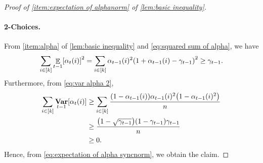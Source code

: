 \documentclass[letterpaper,11pt]{article}
\DeclarePairedDelimiter{\rbra}{\lparen}{\rparen} %
\DeclarePairedDelimiter{\sbra}{\lbrack}{\rbrack} %
\DeclareMathOperator*{\E}{\mathbb{E}}
\DeclareMathOperator*{\Var}{\mathbf{Var}}
\newcommand{\alphanorm}{\gamma}
\begin{document}
\begin{proof}[Proof of \cref{item:expectation of alphanorm} of \cref{lem:basic inequality}]
    \paragraph*{2-Choices.}
    From \cref{item:alpha} of \cref{lem:basic inequality} and
    \cref{eq:squared sum of alpha}, we have 
    \begin{align}
       \sum_{i\in [k]}\E_{t-1}\sbra*{\alpha_t(i)}^2
        =\sum_{i\in [k]}\alpha_{t-1}(i)^2\rbra*{1+\alpha_{t-1}(i)-\alphanorm_{t-1}}^2
        \geq \alphanorm_{t-1}. \label{eq:alphanorm 2choices 1}
    \end{align}
    Furthermore, from \cref{eq:var alpha 2}, 
    \begin{align*}
    \sum_{i\in [k]}\Var_{t-1}[\alpha_t(i)]
    &\geq\sum_{i\in [k]}\frac{\rbra*{1-\alpha_{t-1}(i)}\alpha_{t-1}(i)^2\rbra*{1-\alpha_{t-1}(i)^2}}{n}\\
    &\geq \frac{\qty(1-\sqrt{\alphanorm_{t-1}})\qty(1-\alphanorm_{t-1})\alphanorm_{t-1}}{n}\\
    &\geq 0.
     \end{align*}
     Hence, from \cref{eq:expectation of alpha syncnorm}, we obtain the claim.
\end{proof}


    
%
     
%
    
%
    
%
    
\end{document}
